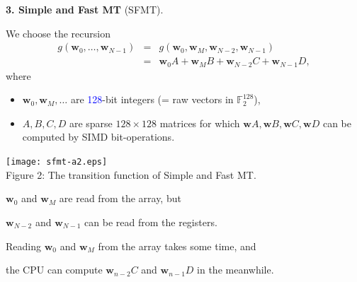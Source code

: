 \documentclass[a4j,12pt,landscape]{jarticle}
\def\F2{{\mathbb F}_2}
\def\bw{{{\mathbf w}}}
\begin{document}
\newpage
\noindent
{\bf 3. Simple and Fast MT} (SFMT).

We choose the recursion
\begin{eqnarray*}
g(\bw_0,\ldots,\bw_{N-1}) &=& g(\bw_0, \bw_M, \bw_{N-2}, \bw_{N-1}) \\
&=& \bw_0A + \bw_MB + \bw_{N-2}C + \bw_{N-1}D,
\end{eqnarray*}
where 
\begin{itemize}
\item
$\bw_0, \bw_M, \ldots$ are \textcolor{blue}{128}-bit integers 
(= raw vectors in $\F2^{128}$),

\item
$A, B, C, D$ are sparse $128 \times 128$ matrices
for which $\bw A, \bw B, \bw C, \bw D$ can be computed by
SIMD bit-operations.
\end{itemize}

\newpage
\begin{center}
\texttt{[image: sfmt-a2.eps]}
\\
Figure 2: The transition function of Simple and Fast MT.

$\bw_0$ and $\bw_M$ are read from the array, but

$\bw_{N-2}$ and $\bw_{N-1}$ can be read from the registers.
\end{center}

\newpage
Reading $\bw_0$ and $\bw_M$ from the array takes some time, and 

the CPU can compute $\bw_{n-2}C$ and $\bw_{n-1}D$ in the meanwhile.
\end{document}
